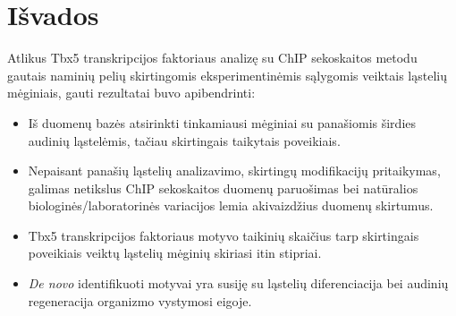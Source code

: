 \documentclass[12pt]{article}
\begin{document}
\newpage


\section{Išvados}
Atlikus Tbx5 transkripcijos faktoriaus analizę su ChIP sekoskaitos
metodu gautais naminių pelių skirtingomis eksperimentinėmis sąlygomis veiktais
ląstelių mėginiais, gauti rezultatai buvo apibendrinti:

\begin{itemize}
    \item Iš duomenų bazės atsirinkti tinkamiausi mėginiai su panašiomis
        širdies audinių ląstelėmis, tačiau skirtingais taikytais poveikiais.
    \item Nepaisant panašių ląstelių analizavimo, skirtingų modifikacijų
        pritaikymas, galimas netikslus ChIP sekoskaitos duomenų paruošimas
        bei natūralios biologinės/laboratorinės variacijos lemia akivaizdžius
        duomenų skirtumus.
    \item Tbx5 transkripcijos faktoriaus motyvo taikinių skaičius tarp
        skirtingais poveikiais veiktų ląstelių mėginių skiriasi itin stipriai.
    \item \emph{De novo} identifikuoti motyvai yra susiję su ląstelių
        diferenciacija bei audinių regeneracija organizmo vystymosi eigoje.
\end{itemize}

\newpage

\end{document}
